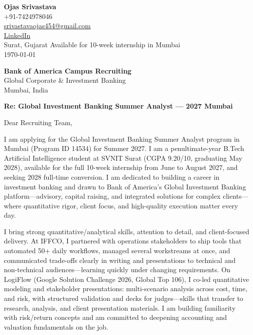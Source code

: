 \documentclass[a4paper,11pt]{article}
\begin{document}
\begin{flushright}
\textbf{Ojas Srivastava} \\
+91-7424978046 \\
\href{mailto:srivastavaojas454@gmail.com}{srivastavaojas454@gmail.com} \\
\href{https://linkedin.com/in/ojas-srivastava05}{LinkedIn} \\
Surat, Gujarat \textbar{} Available for 10-week internship in Mumbai \\
\today
\end{flushright}

\vspace{4mm}
\textbf{Bank of America Campus Recruiting} \\
Global Corporate \& Investment Banking \\
Mumbai, India

\vspace{2mm}
\textbf{Re: Global Investment Banking Summer Analyst --- 2027 \textbar{} Mumbai}

Dear Recruiting Team,

I am applying for the Global Investment Banking Summer Analyst program in Mumbai (Program ID 14534) for Summer 2027. I am a penultimate-year B.Tech Artificial Intelligence student at SVNIT Surat (CGPA 9.20/10, graduating May 2028), available for the full 10-week internship from June to August 2027, and seeking 2028 full-time conversion. I am dedicated to building a career in investment banking and drawn to Bank of America's Global Investment Banking platform---advisory, capital raising, and integrated solutions for complex clients---where quantitative rigor, client focus, and high-quality execution matter every day.

I bring strong quantitative/analytical skills, attention to detail, and client-focused delivery. At IFFCO, I partnered with operations stakeholders to ship tools that automated 50+ daily workflows, managed several workstreams at once, and communicated trade-offs clearly in writing and presentations to technical and non-technical audiences---learning quickly under changing requirements. On LogiFlow (Google Solution Challenge 2026, Global Top 106), I co-led quantitative modeling and stakeholder presentations: multi-scenario analysis across cost, time, and risk, with structured validation and decks for judges---skills that transfer to research, analysis, and client presentation materials. I am building familiarity with risk/return concepts and am committed to deepening accounting and valuation fundamentals on the job.
\end{document}
